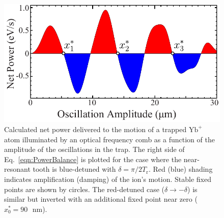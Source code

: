 \documentclass[preprint,superscriptaddress,amsmath,amssymb,aps,prl]{revtex4-1}
\begin{document}
\begin{figure}
\begin{center}
\includegraphics[width=1.0\columnwidth]{New_Theory_With_Everything_for_Paper_03.pdf}
\end{center}
\caption{Calculated net power delivered to the motion of a trapped $\mathrm{Yb}^+$ atom illuminated by an optical frequency comb as a function of the amplitude of the oscillations in the trap. The right side of Eq.~\ref{eqn:PowerBalance} is plotted for the case where the near-resonant tooth is blue-detuned with $\delta = \pi/2T_\mathrm{r}$.  Red (blue) shading indicates amplification (damping) of the ion's motion.  Stable fixed points are shown by circles. The red-detuned case ($\delta \! \rightarrow -\delta$) is similar but inverted with an additional fixed point near zero ($x_0^* = 90 \mbox{ }\mbox{nm}$).}
\label{fig:TheoryPowervsAmplitude}
\end{figure}
\end{document}
